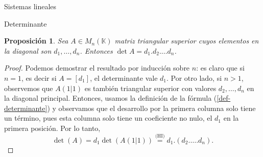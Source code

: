 \documentclass[a4paper,12pt,twoside,spanish,reqno]{amsbook}
\newtheorem{proposicion}[teorema]{Proposici\'on}
\theoremstyle{definition}
\theoremstyle{remark}
\newcommand{\K}{\mathbb K}
\begin{document}
\begin{chapter}{Sistemas lineales}
\begin{section}{Determinante}
	\begin{comment}
		\begin{proposicion}
		Sea $A \in M_n(\K)$ matriz triangular  cuyos elementos en la diagonal son $d_1,\ldots,d_n$. Entonces $\det A = d_1.d_2.\ldots d_n$.
		\end{proposicion}
		\begin{proof} Si $A$ es triangular superior podemos demostrar el resultado por inducción sobre $n$: es claro que si $n=1$,  es decir si $A = [d_1]$, el determinante vale $d_1$. Por otro lado, si $n>1$,  observemos que $A(1|1)$ es también triangular superior con valores $d_2,\ldots,d_n$  en la diagonal principal. Entonces,  usamos la definición de la fórmula (\ref{def-determinante}) y observamos que el desarrollo por la primera  columna solo tiene un término, pues esta columna solo tiene un coeficiente no nulo, el $d_1$ en la primera posición. Por lo tanto, 
		\begin{equation*}
		\det(A) = d_1 \det(A(1|1)) \stackrel{\text{(HI)}}{=} d_1.(d_2.\ldots.d_n).
		\end{equation*}
		
		En  el caso  que  $A$ sea triangular inferior también lo demostraremos por inducción. El caso $n=1$ es trivial. Si $n >1$, observemos que  $A(1|1)$ es también triangular inferior con valores $d_2,\ldots,d_n$  en la diagonal principal y si $i >1$, $A(i|1)$ es triangular inferior con el primer valor en la diagonal igual a 0. Por hipótesis inductiva $\det(A(1|1)) = d_2.\ldots.d_n$ y si $i >1$, $\det(A(i|1)) = 0\times \ldots = 0$, por lo tanto 
		\begin{equation*}
		\det(A) = d_1 \det(A(1|1))+ \sum_{i=2}^{n} a_{i1}\det(A(i|1)) =  d_1.(d_2.\ldots.d_n) + 0.
		\end{equation*} 
		\end{proof}
	\end{comment}

	\begin{proposicion}\label{det-triang-sup}
	Sea $A \in M_n(\K)$ matriz triangular  superior cuyos elementos en la diagonal son $d_1,\ldots,d_n$. Entonces $\det A = d_1.d_2.\ldots d_n$.
	\end{proposicion}
	\begin{proof} Podemos demostrar el resultado por inducción sobre $n$: es claro que si $n=1$,  es decir si $A = [d_1]$, el determinante vale $d_1$. Por otro lado, si $n>1$,  observemos que $A(1|1)$ es también triangular superior con valores $d_2,\ldots,d_n$  en la diagonal principal. Entonces,  usamos la definición de la fórmula (\ref{def-determinante}) y observamos que el desarrollo por la primera  columna solo tiene un término, pues esta columna solo tiene un coeficiente no nulo, el $d_1$ en la primera posición. Por lo tanto, 
		\begin{equation*}
		\det(A) = d_1 \det(A(1|1)) \stackrel{\text{(HI)}}{=} d_1.(d_2.\ldots.d_n).
		\end{equation*}
	\end{proof}
	

\end{section}
\end{chapter}
\end{document}
